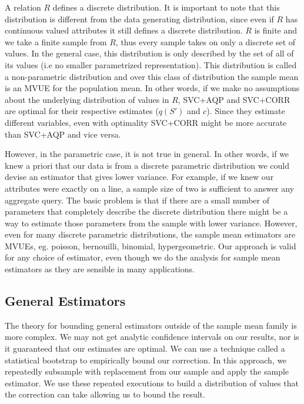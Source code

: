A relation $R$ defines a discrete distribution.
It is important to note that this distribution is different from the data generating distribution, since even if $R$ has continuous valued attributes
it still defines a discrete distribution.
$R$ is finite and we take a finite sample from $R$, thus every sample takes on only a discrete set of values.
In the general case, this distribution is only described by the set of all of its values (i.e no smaller parametrized representation).
This distribution is called a non-parametric distribution and over this class of distribution the sample mean is an MVUE for the population mean.
In other words, if we make no assumptions about the underlying distribution of values in $R$, SVC+AQP and SVC+CORR are optimal for their respective estimates ($q(S')$ and $c$).
Since they estimate different variables, even with optimality SVC+CORR might be more accurate than SVC+AQP and vice versa.  

However, in the parametric case, it is not true in general.
In other words, if we knew a priori that our data is from a discrete parametric distribution we could devise
an estimator that gives lower variance.
For example, if we knew our attributes were exactly on a line, a sample size of two is sufficient to answer any aggregate query.
The basic problem is that if there are a small number of parameters that completely describe the discrete distribution there might be 
a way to estimate those parameters from the sample with lower variance.
However, even for many discrete parametric distributions, the sample mean estimators are MVUEs, eg. poisson, bernouilli, binomial, hypergeometric.
Our approach is valid for any choice of estimator, even though we do the analysis for sample mean estimators as they are sensible in many applications.

\subsection{General Estimators}

The theory for bounding general estimators outside of the sample mean family is more complex.
We may not get analytic confidence intervals on our results, nor is it guaranteed that our estimates are optimal.
We can use a technique called a statistical bootstrap \cite{AgarwalMPMMS13} to empirically bound our correction.
In this approach, we repeatedly subsample with replacement from our sample and apply the sample estimator.
We use these repeated executions to build a distribution of values that the correction can take allowing us to bound the result.

